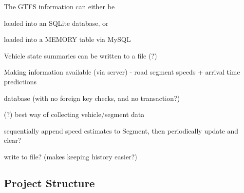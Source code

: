 \begin{DoxyItemize}
\begin{DoxyItemize}
\begin{DoxyItemize}
\end{DoxyItemize}
\end{DoxyItemize}
\item The G\+T\+FS information can either be
\begin{DoxyItemize}
\item loaded into an S\+Q\+Lite database, or
\item loaded into a M\+E\+M\+O\+RY table via My\+S\+QL
\end{DoxyItemize}
\item Vehicle state summaries can be written to a file (?)
\item Making information available (via server) -\/ road segment speeds + arrival time predictions
\begin{DoxyItemize}
\item database (with no foreign key checks, and no transaction?)
\end{DoxyItemize}
\end{DoxyItemize}

(?) best way of collecting vehicle/segment data
\begin{DoxyItemize}
\item sequentially append speed estimates to {\ttfamily Segment}, then periodically update and clear?
\item write to file? (makes keeping history easier?)
\end{DoxyItemize}

\subsection*{Project Structure}


